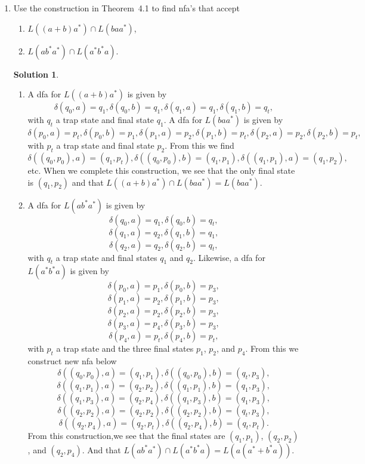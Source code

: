 \documentclass[]{article}
\theoremstyle{definition}
\newtheorem*{soln}{Solution}
\begin{document}
\begin{enumerate}
\item
    Use the construction in Theorem~4.1 to find nfa's that accept
    \begin{enumerate}
        \item $L((a + b )a^\ast) \cap L(baa^\ast)$,
        \item $L(ab^\ast a^\ast) \cap L(a^\ast b^\ast a)$.
    \end{enumerate}
\begin{soln}
    \begin{enumerate}
        \item A dfa for $L((a + b)a^\ast)$ is given by
                $$\delta(q_0, a) = q_1, \delta(q_0, b) = q_1, \delta(q_1, a) = q_1,
                \delta(q_1, b) = q_t,$$
            with $q_t$ a trap state and final state $q_1$. A dfa for $L(baa^\ast)$ is given by
                $$\delta(p_0, a) = p_t, \delta(p_0, b) = p_1, \delta(p_1, a) = p_2,
                \delta(p_1, b) = p_t, \delta(p_2, a) = p_2, \delta(p_2, b) = p_t,$$
            with $p_t$ a trap state and final state $p_2$. From this we find
                $$\delta((q_0, p_0), a) = (q_1, p_t), \delta((q_0, p_0), b) = (q_1, p_1),
                \delta((q_1, p_1), a) = (q_1, p_2),$$
            etc. When we complete this construction, we see that the only final state is
            $(q_1, p_2)$ and that $L((a + b)a^\ast) \cap L(baa^\ast) = L(baa^\ast)$.
        \item A dfa for $L(ab^\ast a^\ast)$ is given by
                $$\delta(q_0, a) = q_1, \delta(q_0, b) = q_t,$$
                $$\delta(q_1, a) = q_2, \delta(q_1, b) = q_1,$$
                $$\delta(q_2, a) = q_2, \delta(q_2, b) = q_t,$$
            with $q_t$ a trap state and final states $q_1$ and $q_2$. Likewise, a dfa for
            $L(a^\ast b^\ast a)$ is given by
                $$\delta(p_0, a) = p_1, \delta(p_0, b) = p_3,$$
                $$\delta(p_1, a) = p_2, \delta(p_1, b) = p_3,$$
                $$\delta(p_2, a) = p_2, \delta(p_2, b) = p_3,$$
                $$\delta(p_3, a) = p_4, \delta(p_3, b) = p_3,$$
                $$\delta(p_4, a) = p_t, \delta(p_4, b) = p_t,$$
            with $p_t$ a trap state and the three final states $p_1$, $p_2$, and $p_4$.
            From this we construct new nfa below
                $$\delta((q_0, p_0), a) = (q_1, p_1), \delta((q_0, p_0), b) = (q_t, p_3),$$
                $$\delta((q_1, p_1), a) = (q_2, p_2), \delta((q_1, p_1), b) = (q_1, p_3),$$
                $$\delta((q_1, p_3), a) = (q_2, p_4), \delta((q_1, p_3), b) = (q_1, p_3),$$
                $$\delta((q_2, p_2), a) = (q_2, p_2), \delta((q_2, p_2), b) = (q_t, p_3),$$
                $$\delta((q_2, p_4), a) = (q_2, p_t), \delta((q_2, p_4), b) = (q_t, p_t).$$
            From this construction,we see that the final states are
            $(q_1, p_1)$, $(q_2, p_2)$, and $(q_2, p_4)$.
            And that $L(ab^\ast a^\ast) \cap L(a^\ast b^\ast a) = L(a(a^\ast + b^\ast a))$.
    \end{enumerate}
\end{soln}


\end{enumerate}
\end{document}
